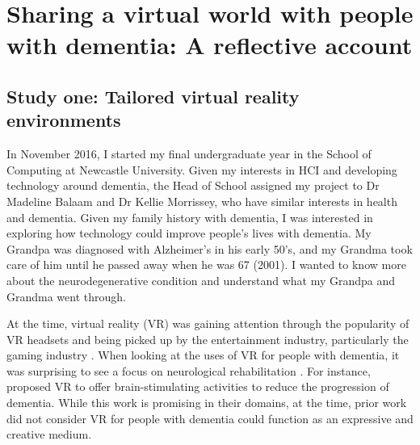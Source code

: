 \chapter{Sharing a virtual world with people with dementia: A reflective account}
\label{NegotatingReseacherParticipantRelationships}

\section{Study one: Tailored virtual reality environments}
\label{StudyOne}
In November 2016, I started my final undergraduate year in the School of Computing at Newcastle University. Given my interests in  HCI and developing technology around dementia, the Head of School assigned my project to Dr Madeline Balaam and Dr Kellie Morrissey, who have similar interests in health and dementia. Given my family history with dementia, I was interested in exploring how technology could improve people's lives with dementia. My Grandpa was diagnosed with Alzheimer’s in his early 50’s, and my Grandma took care of him until he passed away when he was 67 (2001). I wanted to know more about the neurodegenerative condition and understand what my Grandpa and Grandma went through. 

At the time, virtual reality (VR) was gaining attention through the popularity of VR headsets and being picked up by the entertainment industry, particularly the gaming industry \citep{cipriani_understanding_2014}. When looking at the uses of VR for people with dementia, it was surprising to see a focus on neurological rehabilitation \citep{schultheis_application_2001,mendez2015virtual}. For instance, \citep{garcia2012discussion} proposed VR to offer brain-stimulating activities to reduce the progression of dementia. While this work is promising in their domains, at the time, prior work did not consider VR for people with dementia could function as an expressive and creative medium.

